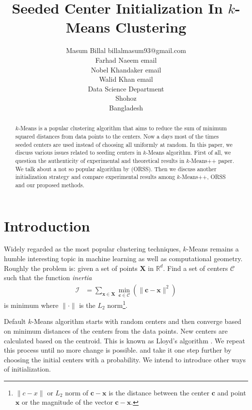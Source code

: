 \documentclass[twoside, 11pt]{article}
\title{Seeded Center Initialization In $k$-Means Clustering}
\author{
	\name Masum Billal 
	\email billalmasum93@gmail.com\\
	\name Farhad Naeem
	\email email\\
	\name Nobel Khandaker
	\email email\\
	\name Walid Khan
	\email email\\
	\addr Data Science Department\\
	Shohoz\\
	Bangladesh
}
\newcommand{\x}{\mathbf{x}}
\newcommand{\X}{\mathbf{X}}
\renewcommand{\c}{\mathbf{c}}
\newcommand{\C}{\mathcal{C}}
\begin{document}
	
	\maketitle
		\begin{abstract}%
			$k$-Means is a popular clustering algorithm that aims to reduce the sum of minimum squared distances from data points to the centers. Now a days most of the times seeded centers are used instead of choosing all uniformly at random. In this paper, we discuss various issues related to seeding centers in $k$-Means algorithm. First of all, we question the authenticity of experimental and theoretical results in $k$-Means++ paper. We talk about a not so popular algorithm by \cite{ostrovsky} (ORSS). Then we discuss another initialization strategy and compare experimental results among $k$-Means++, ORSS and our proposed methods.
		\end{abstract}
	\section{Introduction}
	Widely regarded as the most popular clustering techniques, $k$-Means remains a humble interesting topic in machine learning as well as computational geometry. Roughly the problem is: given a set of points $\X$ in $\mathbb{R}^d$. Find a set of centers $\mathcal{C}$ such that the function \textit{inertia}
		\begin{align*}
			\mathcal{I} & = \sum_{\x\in\X}\min_{\c\in\C}(\|\c-\x\|^2)
		\end{align*}
	is minimum where $\|\cdot\|$ is the $L_2$ norm\footnote{$\|c-x\|$ or $L_2$ norm of $\c-\x$ is the distance between the center $\c$ and point $\x$ or the magnitude of the vector $\c-\x$.}.
	
	Default $k$-Means algorithm starts with random centers and then converge based on minimum distances of the centers from the data points. New centers are calculated based on the centroid. This is known as Lloyd's algorithm \citep{lloyd}. We repeat this process until no more change is possible. \cite{ostrovsky} and \cite{kmeans++} take it one step further by choosing the initial centers with a probability. We intend to introduce other ways of initialization.
\end{document}
